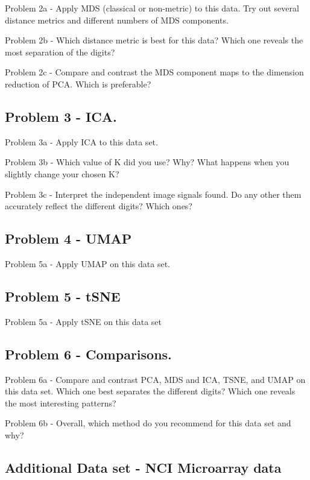 \documentclass[
]{article}
\begin{document}
Problem 2a - Apply MDS (classical or non-metric) to this data. Try out
several distance metrics and different numbers of MDS components.

Problem 2b - Which distance metric is best for this data? Which one
reveals the most separation of the digits?

Problem 2c - Compare and contrast the MDS component maps to the
dimension reduction of PCA. Which is preferable?

\hypertarget{problem-3---ica.}{%
\subsection{Problem 3 - ICA.}\label{problem-3---ica.}}

Problem 3a - Apply ICA to this data set.

Problem 3b - Which value of K did you use? Why? What happens when you
slightly change your chosen K?

Problem 3c - Interpret the independent image signals found. Do any other
them accurately reflect the different digits? Which ones?

\hypertarget{problem-4---umap}{%
\subsection{Problem 4 - UMAP}\label{problem-4---umap}}

Problem 5a - Apply UMAP on this data set.

\hypertarget{problem-5---tsne}{%
\subsection{Problem 5 - tSNE}\label{problem-5---tsne}}

Problem 5a - Apply tSNE on this data set

\hypertarget{problem-6---comparisons.}{%
\subsection{Problem 6 - Comparisons.}\label{problem-6---comparisons.}}

Problem 6a - Compare and contrast PCA, MDS and ICA, TSNE, and UMAP on
this data set. Which one best separates the different digits? Which one
reveals the most interesting patterns?

Problem 6b - Overall, which method do you recommend for this data set
and why?

\hypertarget{additional-data-set---nci-microarray-data}{%
\subsection{Additional Data set - NCI Microarray
data}\label{additional-data-set---nci-microarray-data}}
\end{document}

